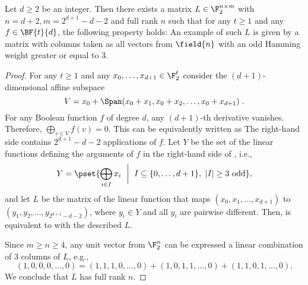 \begin{proposition}
Let $d \ge 2$ be an integer. Then there exists a matrix $L \in \F_2^{n \times m}$ with $n = d+2, m=2^{d+1}-d-2$ and full rank $n$ such that for any $t \ge 1$ and any $f \in \BF{t}{d}$, the following property holds: 
An example of such $L$ is given by a matrix with columns taken as all vectors from $\field{n}$ with an odd Hamming weight greater or equal to 3.
\end{proposition}
\begin{proof}
For any $t \ge 1$ and any $x_0,\ldots,x_{d+1}\in \F_2^t$ consider the $(d+1)$-dimensional affine subspace
\[V = x_0 + \Span(x_0+x_1,x_0+x_2,\ldots,x_0+x_{d+1})\;.\]
For any Boolean function $f$ of degree $d$, any $(d+1)$-th derivative vanishes. Therefore, $\bigoplus_{v \in V} f(v) = 0$. This can be equivalently written as
The right-hand side contains $2^{d+1}-d-2$ applications of $f$. Let $Y$ be the set of the linear functions defining the arguments of $f$ in the right-hand side of , i.e.,
$$
Y =
\pset{ \bigoplus_{i \in I}x_i ~\biggm|~ I \subseteq \{0, \ldots, d+1\}, \ |I| \ge 3 ~\text{odd} },
$$
and let $L$ be the matrix of the linear function that maps $(x_0, x_1, \ldots, x_{d+1})$ to $(y_1, y_2, \ldots, y_{2^{d+1}-d-2})$, where $y_i \in Y$ and all $y_i$ are pairwise different. Then,  is equivalent to  with the described $L$.

Since $m \ge n \ge 4$, any unit vector from $\F_2^n$ can be expressed a linear combination of 3 columns of $L$, e.g., $$
(1,0,0,0,\ldots,0)=(1,1,1,0,\ldots,0)+(1,0,1,1,\ldots, 0)+(1,1,0,1,\ldots,0).
$$
We conclude that $L$ has full rank $n$.
\end{proof}


